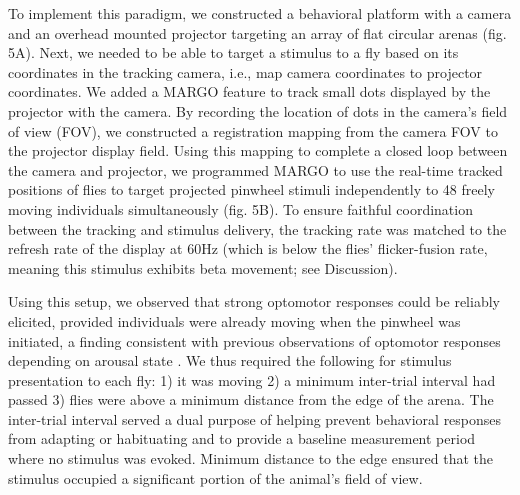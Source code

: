\documentclass[10pt]{article}
\begin{document}
\begin{multicols}{2}
To implement this paradigm, we constructed a behavioral platform with a camera and an overhead mounted projector targeting an array of flat circular arenas (fig. 5A). Next, we needed to be able to target a stimulus to a fly based on its coordinates in the tracking camera, i.e., map camera coordinates to projector coordinates. We added a MARGO feature to track small dots displayed by the projector with the camera. By recording the location of dots in the camera's field of view (FOV), we constructed a registration mapping from the camera FOV to the projector display field. Using this mapping to complete a closed loop between the camera and projector, we programmed MARGO to use the real-time tracked positions of flies to target projected pinwheel stimuli independently to 48 freely moving individuals simultaneously (fig. 5B). To ensure faithful coordination between the tracking and stimulus delivery, the tracking rate was matched to the refresh rate of the display at 60Hz (which is below the flies' flicker-fusion rate, meaning this stimulus exhibits beta movement\cite{haag_arenz_serbe_gabbiani_borst_2016}; see Discussion). 

Using this setup, we observed that strong optomotor responses could be reliably elicited, provided individuals were already moving when the pinwheel was initiated, a finding consistent with previous observations of optomotor responses depending on arousal state \cite{Zhu_Peripheral_2009,Kim_Fly_2016}. We thus required the following for stimulus presentation to each fly: 1) it was moving 2) a minimum inter-trial interval had passed 3) flies were above a minimum distance from the edge of the arena. The inter-trial interval served a dual purpose of helping prevent behavioral responses from adapting or habituating and to provide a baseline measurement period where no stimulus was evoked. Minimum distance to the edge ensured that the stimulus occupied a significant portion of the animal's field of view. 


\end{multicols}
\end{document}
